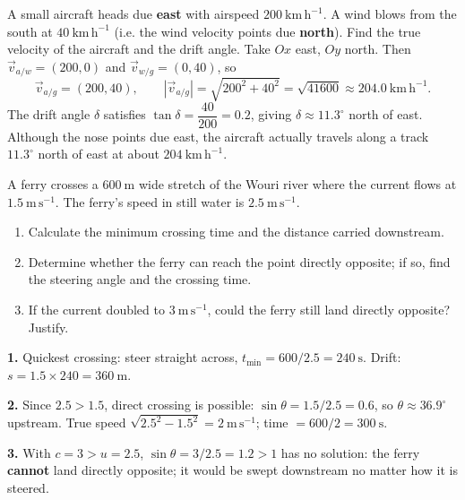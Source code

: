 \documentclass[11pt]{article}
\begin{document}
\begin{exoresolu}
A small aircraft heads due \textbf{east} with airspeed $200\ \mathrm{km\,h^{-1}}$. A wind blows from the south at $40\ \mathrm{km\,h^{-1}}$ (i.e. the wind velocity points due \textbf{north}). Find the true velocity of the aircraft and the drift angle.
\tcblower
Take $Ox$ east, $Oy$ north. Then $\vec{v}_{a/w} = (200, 0)$ and $\vec{v}_{w/g} = (0, 40)$, so
\[
\vec{v}_{a/g} = (200, 40), \qquad |\vec{v}_{a/g}| = \sqrt{200^2 + 40^2} = \sqrt{41600} \approx 204.0\ \mathrm{km\,h^{-1}}.
\]
The drift angle $\delta$ satisfies $\tan\delta = \dfrac{40}{200} = 0.2$, giving $\delta \approx 11.3^\circ$ north of east. Although the nose points due east, the aircraft actually travels along a track $11.3^\circ$ north of east at about $204\ \mathrm{km\,h^{-1}}$.
\end{exoresolu}

\begin{exercice}
A ferry crosses a $600\ \mathrm{m}$ wide stretch of the Wouri river where the current flows at $1.5\ \mathrm{m\,s^{-1}}$. The ferry's speed in still water is $2.5\ \mathrm{m\,s^{-1}}$.
\begin{enumerate}
\item Calculate the minimum crossing time and the distance carried downstream.
\item Determine whether the ferry can reach the point directly opposite; if so, find the steering angle and the crossing time.
\item If the current doubled to $3\ \mathrm{m\,s^{-1}}$, could the ferry still land directly opposite? Justify.
\end{enumerate}
\end{exercice}

\begin{corrige}
\textbf{1.} Quickest crossing: steer straight across, $t_{\min} = 600/2.5 = 240\ \mathrm{s}$. Drift: $s = 1.5 \times 240 = 360\ \mathrm{m}$.

\textbf{2.} Since $2.5 > 1.5$, direct crossing is possible: $\sin\theta = 1.5/2.5 = 0.6$, so $\theta \approx 36.9^\circ$ upstream. True speed $\sqrt{2.5^2 - 1.5^2} = 2\ \mathrm{m\,s^{-1}}$; time $= 600/2 = 300\ \mathrm{s}$.

\textbf{3.} With $c = 3 > u = 2.5$, $\sin\theta = 3/2.5 = 1.2 > 1$ has no solution: the ferry \textbf{cannot} land directly opposite; it would be swept downstream no matter how it is steered.
\end{corrige}
\end{document}
